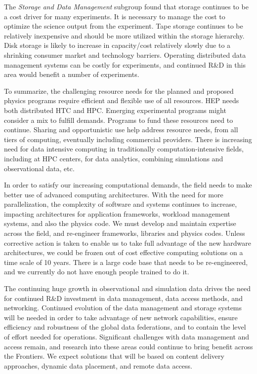 The {\it Storage and Data Management} subgroup found that storage continues
to be a cost driver for many experiments. It is necessary to manage the
cost to optimize the science output from the experiment. Tape storage
continues to be relatively inexpensive and should be more utilized within
the storage hierarchy. 
Disk storage is likely to increase in capacity/cost relatively slowly due
to a shrinking consumer market and technology barriers.
Operating distributed data management systems can be costly for
experiments, and continued R\&D in this area would benefit a number of 
experiments.

To summarize, the challenging resource needs for the planned and proposed
physics programs require efficient and flexible use of all resources. HEP
needs both distributed HTC and HPC. Emerging experimental programs might
consider a mix to fulfill demands. Programs to fund these resources need to
continue. Sharing and opportunistic use help address resource needs, from
all tiers of computing, eventually including commercial providers. There is
increasing need for data intensive computing in traditionally
computation-intensive fields, including at HPC centers, for data analytics,
combining simulations and observational data, etc.

In order to satisfy our increasing computational demands, the field needs
to make better use of advanced computing architectures. With the need for
more parallelization, the complexity of software and systems continues to
increase, impacting architectures for application frameworks, workload
management systems, and also the physics code. We must develop and maintain
expertise across the field, and re-engineer frameworks, libraries and
physics codes. Unless corrective action is taken to enable us to take full
advantage of the new hardware architectures, we could be frozen out of cost
effective computing solutions on a time scale of 10 years. There is a large
code base that needs to be re-engineered, and we currently do not have
enough people trained to do it.

The continuing huge growth in observational and simulation data drives the
need for continued R\&D investment in data management, data access methods,
and networking. Continued evolution of the data management and storage
systems will be needed in order to take advantage of new network
capabilities, ensure efficiency and robustness of the global data
federations, and to contain the level of effort needed for operations.
Significant challenges with data management and access remain, and research
into these areas could continue to bring benefit across the Frontiers.  We
expect solutions that will be based on content delivery approaches, dynamic
data placement, and remote data access.

